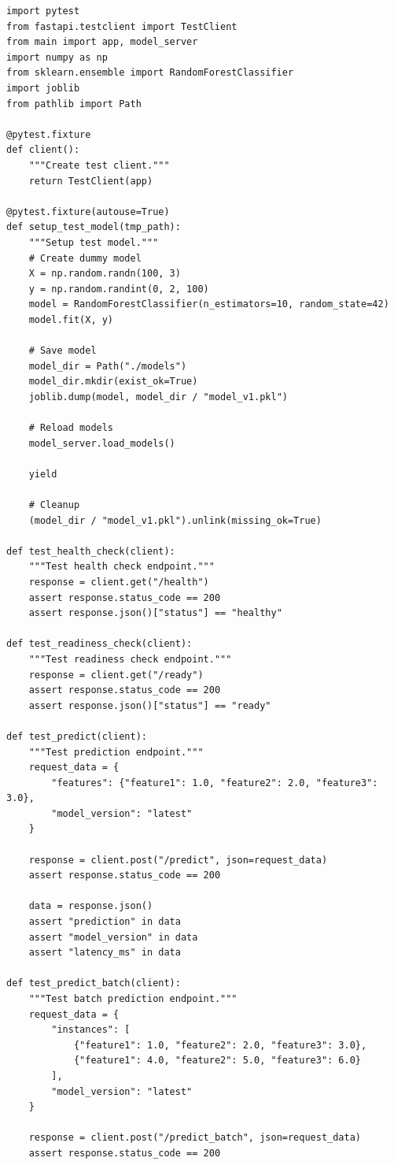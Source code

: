 \begin{lstlisting}[style=python, caption={API Testing with pytest}]
import pytest
from fastapi.testclient import TestClient
from main import app, model_server
import numpy as np
from sklearn.ensemble import RandomForestClassifier
import joblib
from pathlib import Path

@pytest.fixture
def client():
    """Create test client."""
    return TestClient(app)

@pytest.fixture(autouse=True)
def setup_test_model(tmp_path):
    """Setup test model."""
    # Create dummy model
    X = np.random.randn(100, 3)
    y = np.random.randint(0, 2, 100)
    model = RandomForestClassifier(n_estimators=10, random_state=42)
    model.fit(X, y)

    # Save model
    model_dir = Path("./models")
    model_dir.mkdir(exist_ok=True)
    joblib.dump(model, model_dir / "model_v1.pkl")

    # Reload models
    model_server.load_models()

    yield

    # Cleanup
    (model_dir / "model_v1.pkl").unlink(missing_ok=True)

def test_health_check(client):
    """Test health check endpoint."""
    response = client.get("/health")
    assert response.status_code == 200
    assert response.json()["status"] == "healthy"

def test_readiness_check(client):
    """Test readiness check endpoint."""
    response = client.get("/ready")
    assert response.status_code == 200
    assert response.json()["status"] == "ready"

def test_predict(client):
    """Test prediction endpoint."""
    request_data = {
        "features": {"feature1": 1.0, "feature2": 2.0, "feature3": 3.0},
        "model_version": "latest"
    }

    response = client.post("/predict", json=request_data)
    assert response.status_code == 200

    data = response.json()
    assert "prediction" in data
    assert "model_version" in data
    assert "latency_ms" in data

def test_predict_batch(client):
    """Test batch prediction endpoint."""
    request_data = {
        "instances": [
            {"feature1": 1.0, "feature2": 2.0, "feature3": 3.0},
            {"feature1": 4.0, "feature2": 5.0, "feature3": 6.0}
        ],
        "model_version": "latest"
    }

    response = client.post("/predict_batch", json=request_data)
    assert response.status_code == 200


\end{lstlisting}
